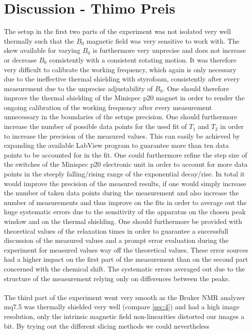 
\section{Discussion - Thimo Preis}
The setup in the first two parts of the experiment was not isolated very well thermally such that the $B_0$ magnetic field was very sensitive to work with. The skew available for varying $B_0$ is furthermore very unprecise and does not increase or decrease $B_0$ consistently with a consistent rotating motion. It was therefore very difficult to calibrate the working frequency, which again is only necessary due to the ineffective thermal shielding with styrofoam, consistently after every measurement due to the unprecise adjustability of $B_0$. One should therefore improve the thermal shielding of the Minispec p20 magnet in order to render the ongoing calibration of the working frequency after every measurement unnecessary in the boundaries of the setups precision. One should furthermore increase the number of possible data points for the used fit of $T_1$ and $T_2$ in order to increase the precision of the measured values. This can easily be achieved by expanding the available LabView program to guarantee more than ten data points to be accounted for in the fit. One could furthermore refine the step size of the switches of the Minispec p20 electronic unit in order to account for more data points in the steeply falling/rising range of the exponential decay/rise. In total it would improve the precision of the measured results, if one would simply increase the number of taken data points during the measurement and also increase the number of measurements and thus improve on the fits in order to average out the huge systematic errors due to the sensitivity of the apparatus on the chosen peak window and on the thermal shielding.  One should furthermore be provided with theoretical values of the relaxation times in order to guarantee a successfull discussion of the measured values and a prompt error evaluation during the experiment for measured values way off the theoretical values. These error sources had a higher impact on the first part of the measurement than on the second part concerned with the chemical shift. The systematic errors averaged out due to the structure of the measurement relying only on differences between the peaks.\\
\\
The third part of the experiment went very smooth as the Bruker NMR analyzer mq7.5 was thermally shielded very well (compare \ref{sec:4}) and had a high image resolution, only the intrinsic magnetic field non-linearities distorted our images a bit. By trying out the different slicing methods we could nevertheless 
